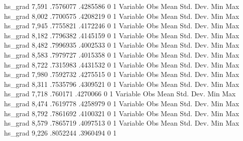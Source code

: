      hs_grad {\VBAR}      7,591    .7576077    .4285586          0          1
{\smallskip}
    Variable {\VBAR}        Obs        Mean    Std. Dev.       Min        Max
     hs_grad {\VBAR}      8,002    .7700575    .4208219          0          1
{\smallskip}
    Variable {\VBAR}        Obs        Mean    Std. Dev.       Min        Max
     hs_grad {\VBAR}      7,945    .7755821    .4172246          0          1
{\smallskip}
    Variable {\VBAR}        Obs        Mean    Std. Dev.       Min        Max
     hs_grad {\VBAR}      8,182    .7796382    .4145159          0          1
{\smallskip}
    Variable {\VBAR}        Obs        Mean    Std. Dev.       Min        Max
     hs_grad {\VBAR}      8,482    .7996935    .4002533          0          1
{\smallskip}
    Variable {\VBAR}        Obs        Mean    Std. Dev.       Min        Max
     hs_grad {\VBAR}      8,583    .7979727    .4015358          0          1
{\smallskip}
    Variable {\VBAR}        Obs        Mean    Std. Dev.       Min        Max
     hs_grad {\VBAR}      8,722    .7315983    .4431532          0          1
{\smallskip}
    Variable {\VBAR}        Obs        Mean    Std. Dev.       Min        Max
     hs_grad {\VBAR}      7,980    .7592732    .4275515          0          1
{\smallskip}
    Variable {\VBAR}        Obs        Mean    Std. Dev.       Min        Max
     hs_grad {\VBAR}      8,311    .7535796    .4309521          0          1
{\smallskip}
    Variable {\VBAR}        Obs        Mean    Std. Dev.       Min        Max
     hs_grad {\VBAR}      7,718     .760171    .4270066          0          1
{\smallskip}
    Variable {\VBAR}        Obs        Mean    Std. Dev.       Min        Max
     hs_grad {\VBAR}      8,474    .7619778    .4258979          0          1
{\smallskip}
    Variable {\VBAR}        Obs        Mean    Std. Dev.       Min        Max
     hs_grad {\VBAR}      8,792    .7861692    .4100321          0          1
{\smallskip}
    Variable {\VBAR}        Obs        Mean    Std. Dev.       Min        Max
     hs_grad {\VBAR}      8,579    .7865719    .4097513          0          1
{\smallskip}
    Variable {\VBAR}        Obs        Mean    Std. Dev.       Min        Max
     hs_grad {\VBAR}      9,226    .8052244    .3960494          0          1
